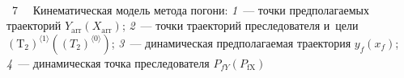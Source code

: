 \begin{multicols}{2}
{ \begin{center}  %
 \vspace*{-4pt}
    \mbox{%
\epsfxsize=79mm
}

\end{center}



\noindent
{{\figurename~7}\ \ \small{
Кинематическая модель метода погони: 
\textit{1}~---  точки предполагаемых траекторий $Y_{\mathrm{arr}} (X_{\mathrm{arr}})$;
\textit{2}~--- точки траекторий преследователя и~цели $(\mathrm{T}_2)^{\langle 1\rangle} ((T_2)^{\langle 0\rangle})$;
\textit{3}~--- динамическая предполагаемая траектория $y_f(x_f)$;
\textit{4}~--- динамическая точка преследователя $P_{fY} (P_{\mathrm{fX}})$
}}}

\vspace*{9pt}



\end{multicols}
